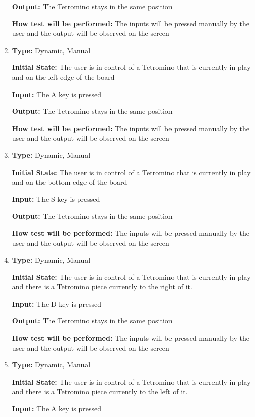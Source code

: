 \documentclass[12pt, titlepage]{article}
\begin{document}
\begin{enumerate}[{FR-CI-}1. ]
		\textbf{Output:} The Tetromino stays in the same position
		
		\textbf{How test will be performed:} The inputs will be pressed manually by the user and the output will be observed on the screen
		
		\item
		\textbf{Type:} Dynamic, Manual
		
		\textbf{Initial State:} The user is in control of a Tetromino that is currently in play and on the left edge of the board
		
		\textbf{Input:} The A key is pressed 
		
		\textbf{Output:} The Tetromino stays in the same position
		
		\textbf{How test will be performed:} The inputs will be pressed manually by the user and the output will be observed on the screen
		
		\item
		\textbf{Type:} Dynamic, Manual
		
		\textbf{Initial State:} The user is in control of a Tetromino that is currently in play and on the bottom edge of the board
		
		\textbf{Input:} The S key is pressed 
		
		\textbf{Output:} The Tetromino stays in the same position
		
		\textbf{How test will be performed:} The inputs will be pressed manually by the user and the output will be observed on the screen
		
		\item
		\textbf{Type:} Dynamic, Manual
		
		\textbf{Initial State:} The user is in control of a Tetromino that is currently in play and there is a Tetromino piece currently to the right of it.
		
		\textbf{Input:} The D key is pressed 
		
		\textbf{Output:} The Tetromino stays in the same position
		
		\textbf{How test will be performed:} The inputs will be pressed manually by the user and the output will be observed on the screen
		
		\item
		\textbf{Type:} Dynamic, Manual
		
		\textbf{Initial State:} The user is in control of a Tetromino that is currently in play and there is a Tetromino piece currently to the left of it.
		
		\textbf{Input:} The A key is pressed 
		

\end{enumerate}
\end{document}
